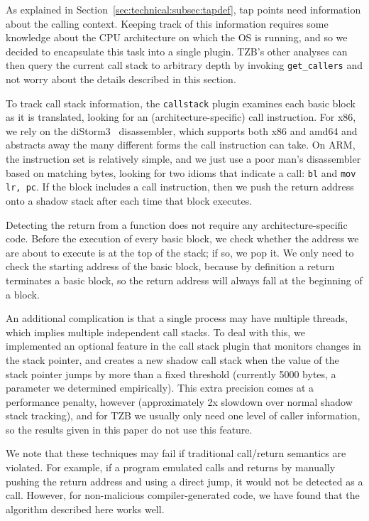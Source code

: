 As explained in Section~\ref{sec:technical:subsec:tapdef}, tap points
need information about the calling context. Keeping track of this
information requires some knowledge about the CPU architecture on which
the OS is running, and so we decided to encapsulate this task into a
single plugin. TZB's other analyses can then query the current call
stack to arbitrary depth by invoking \texttt{get\_callers} and not worry
about the details described in this section.

To track call stack information, the \texttt{callstack} plugin examines
each basic block as it is translated, looking for an
(architecture-specific) call instruction. For x86, we rely on the
diStorm3~\cite{distorm} disassembler, which supports both x86 and amd64
and abstracts away the many different forms the call instruction can
take. On ARM, the instruction set is relatively simple, and we just use
a poor man's disassembler based on matching bytes, looking for two
idioms that indicate a call: \texttt{bl} and \texttt{mov lr, pc}. If the
block includes a call instruction, then we push the return address onto
a shadow stack after each time that block executes.

Detecting the return from a function does not require any
architecture-specific code. Before the execution of every basic block,
we check whether the address we are about to execute is at the top of
the stack; if so, we pop it. We only need to check the starting address
of the basic block, because by definition a return terminates a basic
block, so the return address will always fall at the beginning of a
block.

An additional complication is that a single process may have multiple
threads, which implies multiple independent call stacks. To deal with
this, we implemented an optional feature in the call stack plugin that
monitors changes in the stack pointer, and creates a new shadow call
stack when the value of the stack pointer jumps by more than a fixed
threshold (currently 5000 bytes, a parameter we determined empirically).
This extra precision comes at a performance penalty, however
(approximately 2x slowdown over normal shadow stack tracking), and for
TZB we usually only need one level of caller information, so the results
given in this paper do not use this feature.

We note that these techniques may fail if traditional call/return
semantics are violated. For example, if a program emulated calls and
returns by manually pushing the return address and using a direct jump,
it would not be detected as a call. However, for non-malicious
compiler-generated code, we have found that the algorithm described here
works well.


